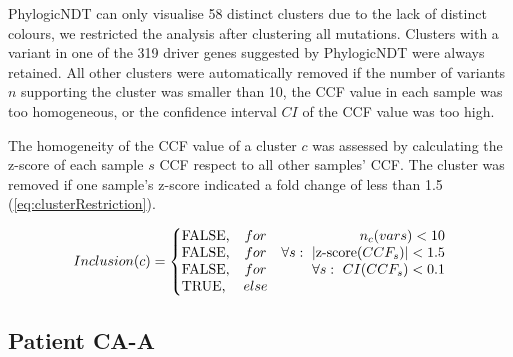 PhylogicNDT can only visualise 58 distinct clusters due to the lack of distinct colours,  we restricted the analysis after clustering all mutations. Clusters with a variant in one of the 319 driver genes suggested by PhylogicNDT were always retained. All other clusters were automatically removed if the number of variants $n$ supporting the cluster was smaller than 10, the CCF value in each sample was too homogeneous, or the confidence interval $CI$ of the CCF value was too high.

The homogeneity of the CCF value of a cluster $c$ was assessed by calculating the z-score of each sample $s$ CCF  respect to all other samples' CCF. The cluster was removed if one sample’s z-score indicated a fold change of less than 1.5 (\autoref{eq:clusterRestriction}).

\begin{equation}
Inclusion(c) = 
	\left\{ 
	\begin{array}{@{}lcr@{}}
		\text{FALSE,} & for & n_c(vars) < 10 \\
	 	\text{FALSE,} & for & \forall s:\ | \text{z-score}(CCF_s) | < 1.5 \\
		\text{FALSE,} & for &\forall s:\ CI(CCF_s) < 0.1 \\
		\text{TRUE,} & else &\\
\end{array} \right. 
\label{eq:clusterRestriction}
\end{equation}
\myequation[\ref{eq:clusterRestriction}]{Inclusion criteria for cluster of PhylogicNDT analysis}


\clearpage

\subsection{Patient CA-A}
\label{cascade-sec:CA99}

